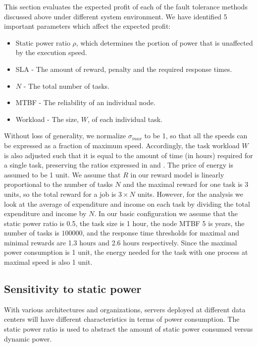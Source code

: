 \noindent This section evaluates the expected profit of each of the fault tolerance
methods discussed above under different system environment. We have identified 5
important parameters which affect the expected profit:
\begin{itemize}
\item Static power ratio $\rho$, which determines the portion of power that is unaffected by the execution speed.
\item SLA - The amount of reward, penalty and the required response times.
\item $N$ - The total number of tasks.
\item MTBF - The reliability of an individual node.
\item Workload - The size, $W$, of each individual task.
\end{itemize}



Without loss of generality, we normalize $\sigma_{max}$ to be 1, so
that all the speeds can be expressed as a fraction of maximum
speed. Accordingly, the task workload $W$ is also adjusted such that
it is equal to the amount of time (in hours) required for a single
task, preserving the ratios expressed in
 and . The price of
energy is assumed to be 1 unit. We assume that $R$ in our reward model
is linearly proportional to the number of tasks $N$ and the maximal
reward for one task is 3 units, so the total reward for a job is $3
\times N$ units.  However, for the analysis we look
at the average of expenditure and income on each task by dividing the
total expenditure and income by $N$. In our basic configuration we
assume that the static power ratio is 0.5, the task size is 1 hour, the node MTBF 5 is
years, the number of tasks is $100000$, and the response time thresholds for
maximal and minimal rewards are 1.3 hours and 2.6 hours
respectively. Since the maximal power consumption is 1 unit, the
energy needed for the task with one process at maximal speed is also 1
unit. 

\subsection{Sensitivity to static power}

With various architectures and organizations, servers deployed at
different data centers will have different characteristics in terms of
power consumption. The static power ratio is used to abstract the
amount of static power consumed versus dynamic power.  


